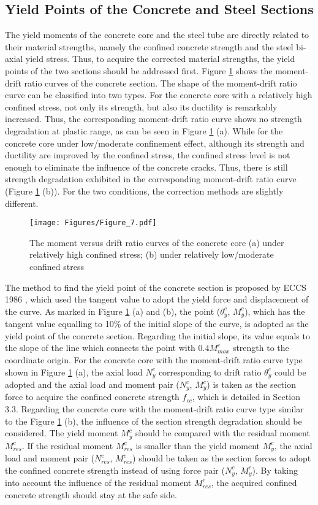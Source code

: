 \documentclass[12pt,a4]{article}
\begin{document}
	\subsection{Yield Points of the Concrete and Steel Sections}
	The yield moments of the concrete core and the steel tube are directly related to their material strengths, namely the confined concrete strength and the steel bi-axial yield stress. Thus, to acquire the corrected material strengths, the yield points of the two sections should be addressed first. Figure \ref{fig-6} shows the moment-drift ratio curves of the concrete section. The shape of the moment-drift ratio curve can be classified into two types. For the concrete core with a relatively high confined stress, not only its strength, but also its ductility is remarkably increased. Thus, the corresponding moment-drift ratio curve shows no strength degradation at plastic range, as can be seen in Figure \ref{fig-6} (a). While for the concrete core under low/moderate confinement effect, although its strength and ductility are improved by the confined stress, the confined stress level is not enough to eliminate the influence of the concrete cracks. Thus, there is still strength degradation exhibited in the corresponding moment-drift ratio curve (Figure \ref{fig-6} (b)). For the two conditions, the correction methods are slightly different.
	\par
	\begin{figure}[h]
		\centering
		\texttt{[image: Figures/Figure\_7.pdf]}
		\caption{The moment versus drift ratio curves of the concrete core (a) under relatively high confined stress; (b) under relatively low/moderate confined stress}
		\label{fig-6}
	\end{figure}
	\par
	The method to find the yield point of the concrete section is proposed by ECCS 1986 \cite{RN88}, which used the tangent value to adopt the yield force and displacement of the curve. As marked in Figure \ref{fig-6} (a) and (b), the point ($θ_y^c$, $M_y^c$), which has the tangent value equalling to 10\% of the initial slope of the curve, is adopted as the yield point of the concrete section. Regarding the initial slope, its value equals to the slope of the line which connects the point with $0.4M_{max}^c$ strength to the coordinate origin. For the concrete core with the moment-drift ratio curve type shown in Figure \ref{fig-6} (a), the axial load $N_y^c$ corresponding to drift ratio $θ_y^c$ could be adopted and the axial load and moment pair ($N_y^c$, $M_y^c$) is taken as the section force to acquire the confined concrete strength $f_{cc}$, which is detailed in Section 3.3. Regarding the concrete core with the moment-drift ratio curve type similar to the Figure \ref{fig-6} (b), the influence of the section strength degradation should be considered. The yield moment $M_y^c$ should be compared with the residual moment $M_{res}^c$. If the residual moment $M_{res}^c$ is smaller than the yield moment $M_y^c$, the axial load and moment pair ($N_{res}^c$, $M_{res}^c$) should be taken as the section forces to adopt the confined concrete strength instead of using force pair ($N_y^c$, $M_y^c$). By taking into account the influence of the residual moment $M_{res}^c$, the acquired confined concrete strength should stay at the safe side.
\end{document}
